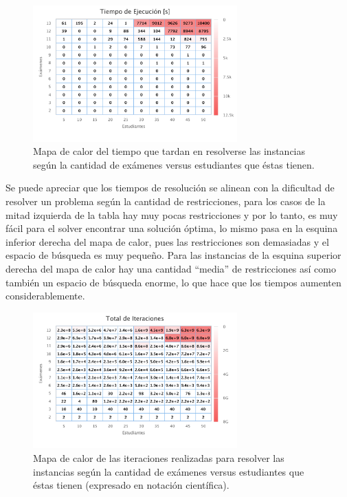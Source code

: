 \documentclass[letter, 10pt]{article}
\begin{document}
\begin{figure}[H]
\begin{center}
\includegraphics[width=0.7\textwidth]{img/g1.pdf}
\end{center}
\caption{Mapa de calor del tiempo que tardan en resolverse las instancias según la cantidad de exámenes versus estudiantes que éstas tienen.}
\label{fig:g1}
\end{figure}

Se puede apreciar que los tiempos de resolución se alinean con la dificultad de resolver un problema según la cantidad de restricciones, para los casos de la mitad izquierda de la tabla hay muy pocas restricciones y por lo tanto, es muy fácil para el solver encontrar una solución óptima, lo mismo pasa en la esquina inferior derecha del mapa de calor, pues las restricciones son demasiadas y el espacio de búsqueda es muy pequeño. Para las instancias de la esquina superior derecha del mapa de calor hay una cantidad ``media'' de restricciones así como también un espacio de búsqueda enorme, lo que hace que los tiempos aumenten considerablemente.

\begin{figure}[H]
\begin{center}
\includegraphics[width=0.7\textwidth]{img/g2.pdf}
\end{center}
\caption{Mapa de calor de las iteraciones realizadas para resolver las instancias según la cantidad de exámenes versus estudiantes que éstas tienen (expresado en notación científica).}
\label{fig:g2}
\end{figure}
\end{document}
